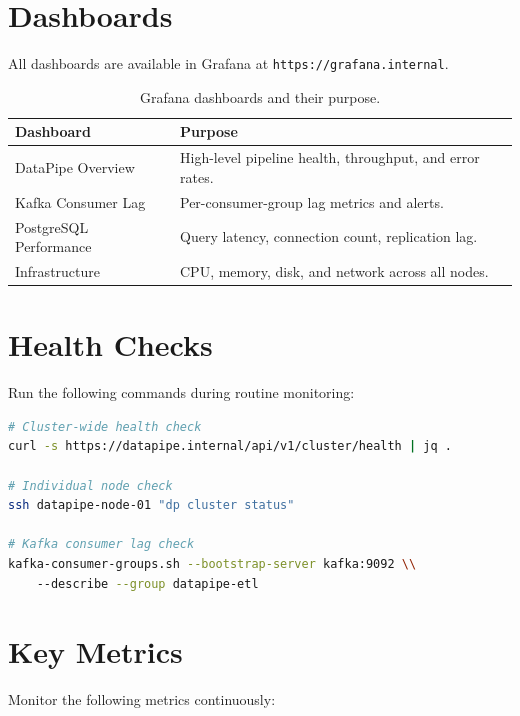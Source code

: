 \documentclass[
    language=english,
    doctype=manual,
    institution=none,
    titlestyle=book,
    oneside,
]{omnilatex}
\begin{document}
\section{Dashboards}

All dashboards are available in Grafana at \texttt{https://grafana.internal}.

\begin{table}[htbp]
    \centering
    \caption{Grafana dashboards and their purpose.}
    \label{tab:dashboards}
    \begin{tabular}{@{}lp{8cm}@{}}
        \toprule
        Dashboard & Purpose \\
        \midrule
        DataPipe Overview & High-level pipeline health, throughput, and error rates. \\
        Kafka Consumer Lag & Per-consumer-group lag metrics and alerts. \\
        PostgreSQL Performance & Query latency, connection count, replication lag. \\
        Infrastructure & CPU, memory, disk, and network across all nodes. \\
        \bottomrule
    \end{tabular}
\end{table}

\section{Health Checks}

Run the following commands during routine monitoring:

\begin{lstlisting}[language=bash, caption={Health check commands.}]
# Cluster-wide health check
curl -s https://datapipe.internal/api/v1/cluster/health | jq .

# Individual node check
ssh datapipe-node-01 "dp cluster status"

# Kafka consumer lag check
kafka-consumer-groups.sh --bootstrap-server kafka:9092 \\
    --describe --group datapipe-etl
\end{lstlisting}

\section{Key Metrics}

Monitor the following metrics continuously:
\end{document}
